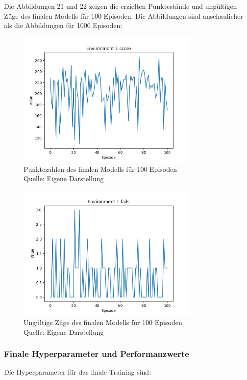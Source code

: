 Die Abbildungen 21 und 22 zeigen die erzielten Punktestände und ungültigen Züge des finalen Modells für 100 Episoden. Die Abbildungen sind anschaulicher als die Abbildungen für 1000 Episoden:
\nopagebreak
\begin{figure}[H]
	\centering
	\includegraphics[width=0.8\textwidth]{Bilder/final4000steps} 
	\caption[Punktezahlen des finalen Modells für 100 Episoden]{Punktezahlen des finalen Modells für 100 Episoden\\ Quelle: Eigene Darstellung}
\end{figure}
\begin{figure}[H]
	\centering
	\includegraphics[width=0.8\textwidth]{Bilder/final4000stepsf} 
	\caption[Ungültige Züge des finalen Modells für 100 Episoden]{Ungültige Züge des finalen Modells für 100 Episoden\\ Quelle: Eigene Darstellung}
\end{figure}
\subsubsection{Finale Hyperparameter und Performanzwerte}
Die Hyperparameter für das finale Training sind:


